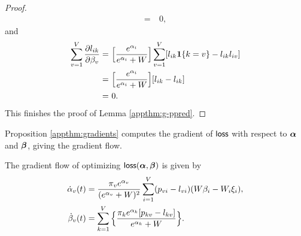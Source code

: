 \begin{proof}
\begin{align*}
= &~ 0,
\end{align*}
and
\begin{align*}
\sum_{v=1}^V \frac{\partial l_{ik}}{\partial \beta_v} = &~   \Big[\frac{e^{\alpha_i}}{e^{\alpha_i}+W}\Big] \sum_{v=1}^V [l_{ik} \bm{1}\{k=v\} - l_{ik} l_{iv} ]\\
= &~ \Big[\frac{e^{\alpha_i}}{e^{\alpha_i}+W}\Big] [l_{ik} - l_{ik} ]\\
= &~ 0.
\end{align*}
This finishes the proof of Lemma \ref{appthm:g-ppred}.
\end{proof}

Proposition \ref{appthm:gradients} computes the gradient of $\mathsf{loss}$ with respect to $\bm{\alpha}$ and $\boldsymbol{\beta}$, giving the gradient flow.
\begin{proposition}\label{appthm:gradients}
The gradient flow of optimizing $\mathsf{loss}(\bm{\alpha}, \boldsymbol{\beta})$ is given by
\begin{align*}
\dot{\alpha}_v(t) & = \frac{\pi_v e^{\alpha_v}}{(e^{\alpha_v}+W)^2} 
\sum_{i=1}^V({p}_{vi}-{l}_{vi})(W\beta_i-W_i\xi_i),\\
\dot{\beta}_v(t) & = \sum_{k=1}^V \Big\{\frac{\pi_k e^{\alpha_k} [p_{kv} - l_{kv}]}{e^{\alpha_k}+W}\Big\}.
\end{align*}
\end{proposition}

